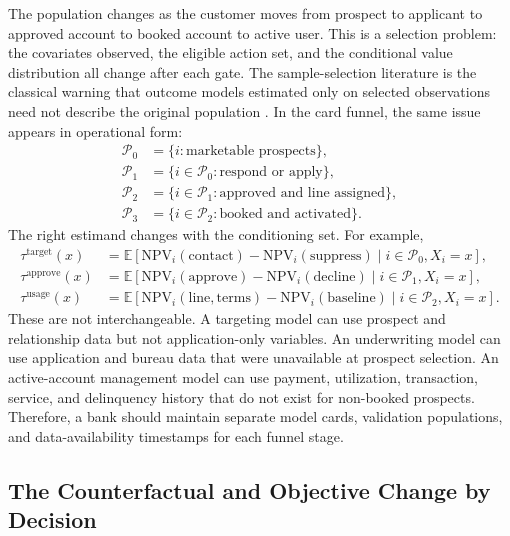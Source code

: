 \documentclass[11pt]{article}
\newcommand{\E}{\mathbb{E}}
\newcommand{\NPV}{\mathrm{NPV}}
\newcommand{\1}{\mathbf{1}}
\begin{document}
The population changes as the customer moves from prospect to applicant to
approved account to booked account to active user. This is a selection problem:
the covariates observed, the eligible action set, and the conditional value
distribution all change after each gate. The sample-selection literature is the
classical warning that outcome models estimated only on selected observations
need not describe the original population \citep{heckman1979selection}. In the
card funnel, the same issue appears in operational form:
\begin{align}
  \mathcal{P}_0 &= \{i:\text{marketable prospects}\},\\
  \mathcal{P}_1 &= \{i\in\mathcal{P}_0:\text{respond or apply}\},\\
  \mathcal{P}_2 &= \{i\in\mathcal{P}_1:\text{approved and line assigned}\},\\
  \mathcal{P}_3 &= \{i\in\mathcal{P}_2:\text{booked and activated}\}.
  \label{eq:funnel-populations}
\end{align}
The right estimand changes with the conditioning set. For example,
\begin{align}
  \tau^{\mathrm{target}}(x)
    &= \E[\NPV_i(\mathrm{contact})-\NPV_i(\mathrm{suppress})
        \mid i\in\mathcal{P}_0,X_i=x],\\
  \tau^{\mathrm{approve}}(x)
    &= \E[\NPV_i(\mathrm{approve})-\NPV_i(\mathrm{decline})
        \mid i\in\mathcal{P}_1,X_i=x],\\
  \tau^{\mathrm{usage}}(x)
    &= \E[\NPV_i(\mathrm{line},\mathrm{terms})-\NPV_i(\mathrm{baseline})
        \mid i\in\mathcal{P}_2,X_i=x].
  \label{eq:funnel-estimands}
\end{align}
These are not interchangeable. A targeting model can use prospect and
relationship data but not application-only variables. An underwriting model can
use application and bureau data that were unavailable at prospect selection.
An active-account management model can use payment, utilization, transaction,
service, and delinquency history that do not exist for non-booked prospects.
Therefore, a bank should maintain separate model cards, validation populations,
and data-availability timestamps for each funnel stage.

\subsection{The Counterfactual and Objective Change by Decision}
\label{subsec:decision-counterfactuals}
\end{document}
